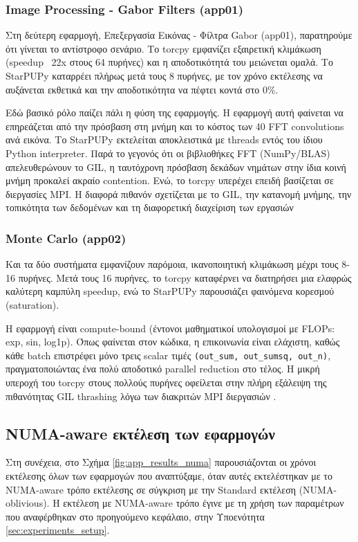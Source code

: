 \subsubsection{Image Processing - Gabor Filters (app01)}

Στη δεύτερη εφαρμογή, Επεξεργασία Εικόνας - Φίλτρα Gabor (app01), παρατηρούμε ότι γίνεται το αντίστροφο σενάριο. Το torcpy εμφανίζει εξαιρετική κλιμάκωση (speedup ~22x στους 64 πυρήνες) και η αποδοτικότητά του μειώνεται ομαλά. Το StarPUPy καταρρέει πλήρως μετά τους 8 πυρήνες, με τον χρόνο εκτέλεσης να αυξάνεται εκθετικά και την αποδοτικότητα να πέφτει κοντά στο 0\%. 

Εδώ βασικό ρόλο παίζει πάλι η φύση της εφαρμογής. Η εφαρμογή αυτή φαίνεται να επηρεάζεται από την πρόσβαση στη μνήμη και το κόστος των 40 FFT convolutions ανά εικόνα. Το StarPUPy εκτελείται αποκλειστικά με threads εντός του ίδιου Python interpreter. Παρά το γεγονός ότι οι βιβλιοθήκες FFT (NumPy/BLAS) απελευθερώνουν το GIL, η ταυτόχρονη πρόσβαση δεκάδων νημάτων στην ίδια κοινή μνήμη προκαλεί ακραίο contention. Ενώ, το torcpy υπερέχει επειδή βασίζεται σε διεργασίες MPI. Η διαφορά πιθανόν σχετίζεται με το GIL, την κατανομή μνήμης, την τοπικότητα των δεδομένων και τη διαφορετική διαχείριση των εργασιών

\subsubsection{Monte Carlo (app02)}

Και τα δύο συστήματα εμφανίζουν παρόμοια, ικανοποιητική κλιμάκωση μέχρι τους 8-16 πυρήνες. Μετά τους 16 πυρήνες, το torcpy καταφέρνει να διατηρήσει μια ελαφρώς καλύτερη καμπύλη speedup, ενώ το StarPUPy παρουσιάζει φαινόμενα κορεσμού (saturation).

Η εφαρμογή είναι compute-bound (έντονοι μαθηματικοί υπολογισμοί με FLOPs: exp, sin, log1p). Όπως φαίνεται στον κώδικα, η επικοινωνία είναι ελάχιστη, καθώς κάθε batch επιστρέφει μόνο τρεις scalar τιμές \texttt{(out\_sum, out\_sumsq, out\_n)}, πραγματοποιώντας ένα πολύ αποδοτικό parallel reduction στο τέλος. Η μικρή υπεροχή του torcpy στους πολλούς πυρήνες οφείλεται στην πλήρη εξάλειψη της πιθανότητας GIL thrashing λόγω των διακριτών MPI διεργασιών \cite{appcode}.

\subsection{NUMA-aware εκτέλεση των εφαρμογών}

Στη συνέχεια, στο Σχήμα \ref{fig:app_results_numa} παρουσιάζονται οι χρόνοι εκτέλεσης όλων των εφαρμογών που αναπτύξαμε, όταν αυτές εκτελέστηκαν με το NUMA-aware τρόπο εκτέλεσης σε σύγκριση με την Standard εκτέλεση (NUMA-oblivious). Η εκτέλεση με NUMA-aware τρόπο έγινε με τη χρήση των παραμέτρων που αναφέρθηκαν στο προηγούμενο κεφάλαιο, στην Υποενότητα \ref{sec:experiments_setup}.

